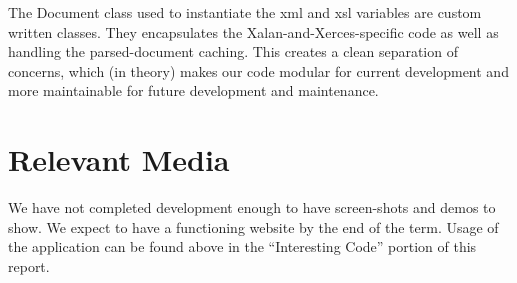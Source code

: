 The Document class used to instantiate the xml and xsl variables are custom written classes.
They encapsulates the Xalan-and-Xerces-specific code as well as handling the parsed-document caching.
This creates a clean separation of concerns, which (in theory) makes our code modular for current development and more maintainable for future development and maintenance.

\section{Relevant Media}

We have not completed development enough to have screen-shots and demos to show.
We expect to have a functioning website by the end of the term.
Usage of the application can be found above in the ``Interesting Code'' portion of this report.




\printbibliography


